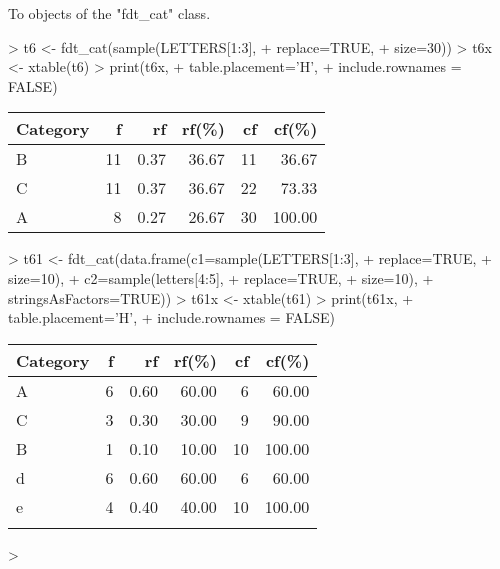 \documentclass[10pt,a4paper]{article}
\begin{document}
To objects of the "fdt\_cat" class.

\begin{Schunk}
\begin{Sinput}
> t6 <- fdt_cat(sample(LETTERS[1:3], 
+                      replace=TRUE,
+                      size=30))
> t6x <- xtable(t6)
> print(t6x,
+       table.placement='H',
+       include.rownames = FALSE)
\end{Sinput}
% latex table generated in R 4.4.0 by xtable 1.8-4 package
% Fri Nov 17 16:34:40 2023
\begin{table}[H]
\centering
\begin{tabular}{lrrrrr}
  \hline
Category & f & rf & rf(\%) & cf & cf(\%) \\ 
  \hline
B &  11 & 0.37 & 36.67 &  11 & 36.67 \\ 
  C &  11 & 0.37 & 36.67 &  22 & 73.33 \\ 
  A &   8 & 0.27 & 26.67 &  30 & 100.00 \\ 
   \hline
\end{tabular}
\end{table}\begin{Sinput}
> t61 <- fdt_cat(data.frame(c1=sample(LETTERS[1:3],
+                                     replace=TRUE,
+                                     size=10),
+                           c2=sample(letters[4:5],
+                                     replace=TRUE,
+                                     size=10),
+                           stringsAsFactors=TRUE))
> t61x <- xtable(t61)
> print(t61x,
+       table.placement='H',
+       include.rownames = FALSE)
\end{Sinput}
% latex table generated in R 4.4.0 by xtable 1.8-4 package
% Fri Nov 17 16:34:40 2023
\begin{table}[H]
\centering
\begin{tabular}{lrrrrr}
  \hline
Category & f & rf & rf(\%) & cf & cf(\%) \\ 
  \hline
A &   6 & 0.60 & 60.00 &   6 & 60.00 \\ 
  C &   3 & 0.30 & 30.00 &   9 & 90.00 \\ 
  B &   1 & 0.10 & 10.00 &  10 & 100.00 \\ 
   \hline
d &   6 & 0.60 & 60.00 &   6 & 60.00 \\ 
  e &   4 & 0.40 & 40.00 &  10 & 100.00 \\ 
   \hline
\multicolumn{6}{l}{}\\
\end{tabular}
\end{table}\begin{Sinput}
> 
\end{Sinput}
\end{Schunk}
\end{document}
